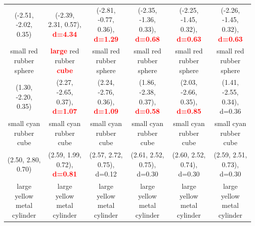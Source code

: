 \documentclass{article}
\begin{document}
\begin{table}[ht!]
{\begin{tabular}{cccccc}
        (-2.51, -2.02, 0.35) &                                                                              (-2.39, 2.31, 0.57), \textcolor{red}{\textbf{d=4.34}} &   (-2.81, -0.77, 0.36), \textcolor{red}{\textbf{d=1.29}} &  (-2.35, -1.36, 0.33), \textcolor{red}{\textbf{d=0.68}} &  (-2.25, -1.45, 0.32), \textcolor{red}{\textbf{d=0.63}} &  (-2.26, -1.45, 0.32), \textcolor{red}{\textbf{d=0.63}} \\
     small red rubber sphere &                                                          \textcolor{red}{\textbf{large}} red rubber \textcolor{red}{\textbf{cube}} &                                  small red rubber sphere &                                 small red rubber sphere &                                 small red rubber sphere &                                 small red rubber sphere \\
         (1.30, -2.20, 0.35) &                                                                              (2.27, -2.65, 0.37), \textcolor{red}{\textbf{d=1.07}} &    (2.24, -2.76, 0.36), \textcolor{red}{\textbf{d=1.09}} &   (1.86, -2.38, 0.37), \textcolor{red}{\textbf{d=0.58}} &   (2.03, -2.66, 0.35), \textcolor{red}{\textbf{d=0.85}} &                             (1.41, -2.55, 0.34), d=0.36 \\
      small cyan rubber cube &                                                                                                             small cyan rubber cube &                                   small cyan rubber cube &                                  small cyan rubber cube &                                  small cyan rubber cube &                                  small cyan rubber cube \\
          (2.50, 2.80, 0.70) &                                                                               (2.59, 1.99, 0.72), \textcolor{red}{\textbf{d=0.81}} &                               (2.57, 2.72, 0.75), d=0.12 &                              (2.61, 2.52, 0.75), d=0.30 &                              (2.60, 2.52, 0.74), d=0.30 &                              (2.59, 2.51, 0.73), d=0.30 \\
 large yellow metal cylinder &                                                                                                        large yellow metal cylinder &                              large yellow metal cylinder &                             large yellow metal cylinder &                             large yellow metal cylinder &                             large yellow metal cylinder \\
\bottomrule
\end{tabular}
}
\end{table}
\end{document}
